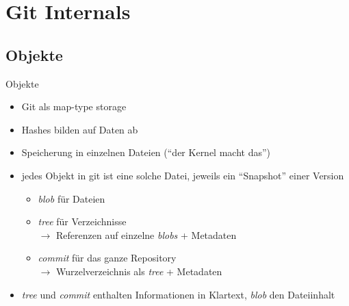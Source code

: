 \documentclass[compress,t]{beamer}
\begin{document}
\section{Git Internals}
\subsection{Objekte}
\begin{frame}{Objekte}
    \begin{itemize}
        \item Git als map-type storage
        \item Hashes bilden auf Daten ab
        \item Speicherung in einzelnen Dateien (``der Kernel macht das'')
        \item jedes Objekt in git ist eine solche Datei, jeweils ein ``Snapshot''
            einer Version
            \begin{itemize}
                \item \emph{blob} für Dateien
                \item \emph{tree} für Verzeichnisse\\
                    $\rightarrow$ Referenzen auf einzelne \emph{blobs} + Metadaten
                \item \emph{commit} für das ganze Repository\\
                    $\rightarrow$ Wurzelverzeichnis als \emph{tree} + Metadaten
            \end{itemize}
        \item \emph{tree} und \emph{commit} enthalten Informationen in Klartext,  \emph{blob} den Dateiinhalt
    \end{itemize}

    \pause
    \vspace{0.5em}
\end{frame}
\end{document}
